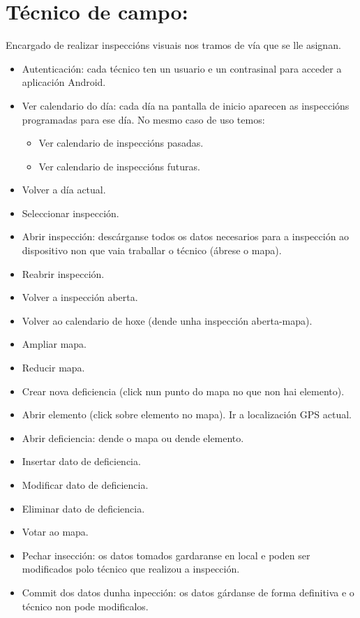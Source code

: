 \documentclass[a4paper,10pt]{article}
\begin{document}
\section{Técnico de campo:} Encargado de realizar inspeccións visuais nos tramos de vía que se lle asignan. 
\begin{itemize}
 \item Autenticación: cada técnico ten un usuario e un contrasinal para acceder a aplicación Android.
 \item Ver calendario do día: cada día na pantalla de inicio aparecen as inspeccións programadas para ese día.
  No mesmo caso de uso temos:
    \begin{itemize}
     \item Ver calendario de inspeccións pasadas.
     \item Ver calendario de inspeccións futuras.
    \end{itemize}
 \item Volver a día actual.
 \item Seleccionar inspección.
 \item Abrir inspección: descárganse todos os datos necesarios para a inspección ao dispositivo non que vaia traballar o técnico (ábrese o mapa).
 \item Reabrir inspección.
 \item Volver a inspección aberta.
 \item Volver ao calendario de hoxe (dende unha inspección aberta-mapa).
 \item Ampliar mapa.
 \item Reducir mapa.
 \item Crear nova deficiencia (click nun punto do mapa no que non hai elemento).
 \item Abrir elemento (click sobre elemento no mapa).
 \Item Ir a localización GPS actual.
 \item Abrir deficiencia: dende o mapa ou dende elemento.
 \item Insertar dato de deficiencia.
 \item Modificar dato de deficiencia.
 \item Eliminar dato de deficiencia.
 \item Votar ao mapa.
 \item Pechar insección: os datos tomados gardaranse en local e poden ser modificados polo técnico que realizou a inspección.
 \item Commit dos datos dunha inpección: os datos gárdanse de forma definitiva e o técnico non pode modificalos.
\end{itemize}
\end{document}

